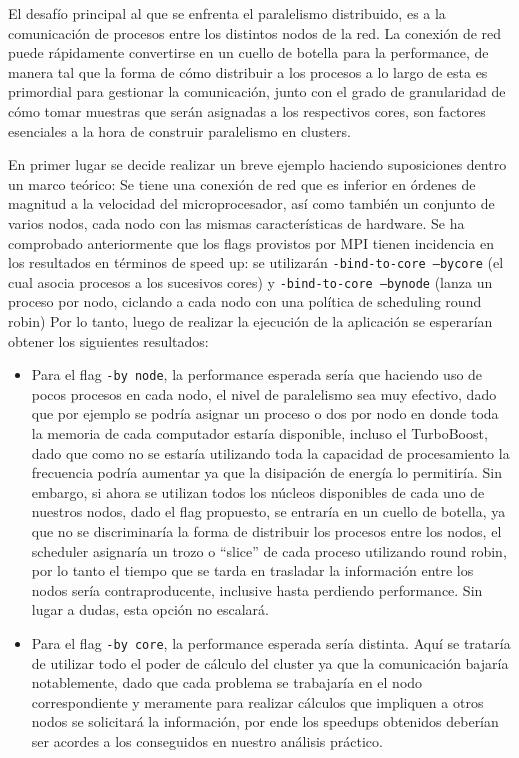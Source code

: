 \documentclass{article}
\begin{document}
El desafío principal al que se enfrenta el paralelismo distribuido, es a la comunicación de procesos entre los distintos nodos de la red. La conexión de red puede rápidamente convertirse en un cuello de botella para la performance, de manera tal que la forma de cómo distribuir a los procesos a lo largo de esta es primordial para gestionar la comunicación, junto con el grado de granularidad de cómo tomar muestras que serán asignadas a los respectivos cores, son factores esenciales a la hora de construir paralelismo en clusters.

En primer lugar se decide realizar un breve ejemplo haciendo suposiciones dentro un marco teórico: Se tiene una conexión de red que es inferior en órdenes de magnitud a la velocidad del microprocesador, así como también un conjunto de varios nodos, cada nodo con las mismas características de hardware. Se ha comprobado anteriormente que los flags provistos por MPI tienen incidencia en los resultados en términos de speed up: se utilizarán \texttt{-bind-to-core –bycore} (el cual asocia procesos a los sucesivos cores) y \texttt{-bind-to-core –bynode} (lanza un proceso por nodo, ciclando a cada nodo con una política de scheduling round robin) Por lo tanto, luego de realizar la ejecución de la aplicación se esperarían obtener los siguientes resultados:
\begin{itemize} 
    \item Para el flag \texttt{-by node}, la performance esperada sería que haciendo uso de pocos procesos en cada nodo, el nivel de paralelismo sea muy efectivo, dado que por ejemplo se podría asignar un proceso o dos por nodo en donde toda la memoria de cada computador estaría disponible, incluso el TurboBoost, dado que como no se estaría utilizando toda la capacidad de procesamiento la frecuencia podría aumentar ya que la disipación de energía lo permitiría. Sin embargo, si ahora se utilizan todos los núcleos disponibles de cada uno de nuestros nodos, dado el flag propuesto, se entraría en un cuello de botella, ya que no se discriminaría la forma de distribuir los procesos entre los nodos, el scheduler asignaría un trozo o ``slice'' de cada proceso utilizando round robin, por lo tanto el tiempo que se tarda en trasladar la información entre los nodos sería contraproducente, inclusive hasta perdiendo performance. Sin lugar a dudas, esta opción no escalará.  
    \item Para el flag \texttt{-by core}, la performance esperada sería distinta. Aquí se trataría de utilizar todo el poder de cálculo del cluster ya que la comunicación bajaría notablemente, dado que cada problema se trabajaría en el nodo correspondiente y meramente para realizar cálculos que impliquen a otros nodos se solicitará la información, por ende los speedups obtenidos deberían ser acordes a los conseguidos en nuestro análisis práctico.
\end{itemize}
\end{document}
